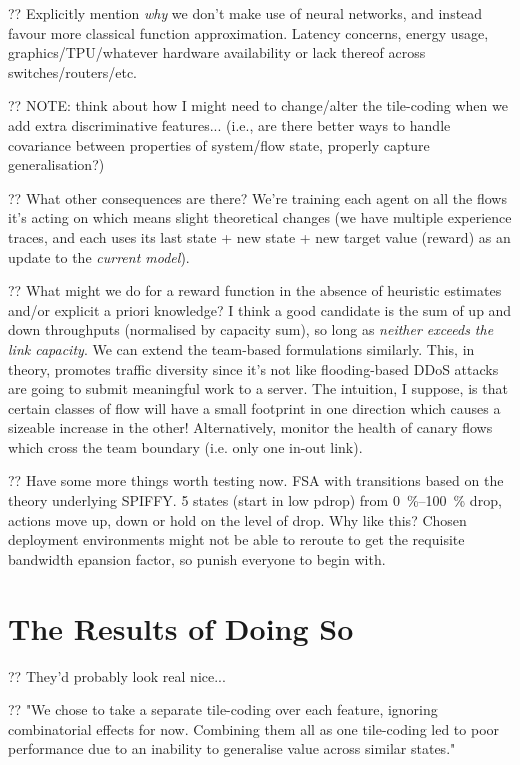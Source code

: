 \documentclass[conference, letterpaper, 10pt, times]{IEEEtran}
\begin{document}
?? Explicitly mention \emph{why} we don't make use of neural networks, and instead favour more classical function approximation. Latency concerns, energy usage, graphics/TPU/whatever hardware availability or lack thereof across switches/routers/etc.

?? NOTE: think about how I might need to change/alter the tile-coding when we add extra discriminative features... (i.e., are there better ways to handle covariance between properties of system/flow state, properly capture generalisation?)

?? What other consequences are there? We're training each agent on all the flows it's acting on which means slight theoretical changes (we have multiple experience traces, and each uses its last state + new state + new target value (reward) as an update to the \emph{current model}).

?? What might we do for a reward function in the absence of heuristic estimates and/or explicit a priori knowledge? I think a good candidate is the sum of up and down throughputs (normalised by capacity sum), so long as \emph{neither exceeds the link capacity}. We can extend the team-based formulations similarly. This, in theory, promotes traffic diversity since it's not like flooding-based DDoS attacks are going to submit meaningful work to a server. The intuition, I suppose, is that certain classes of flow will have a small footprint in one direction which causes a sizeable increase in the other! Alternatively, monitor the health of canary flows which cross the team boundary (i.e. only one in-out link).

?? Have some more things worth testing now. FSA with transitions based on the theory underlying SPIFFY. 5 states (start in low pdrop) from \SIrange{0}{100}{\percent} drop, actions move up, down or hold on the level of drop. Why like this? Chosen deployment environments might not be able to reroute to get the requisite bandwidth epansion factor, so punish everyone to begin with.

\section{The Results of Doing So}\label{sec:the-results-of-doing-so}

?? They'd probably look real nice...

?? "We chose to take a separate tile-coding over each feature, ignoring combinatorial effects for now. Combining them all as one tile-coding led to poor performance due to an inability to generalise value across similar states."
\end{document}
